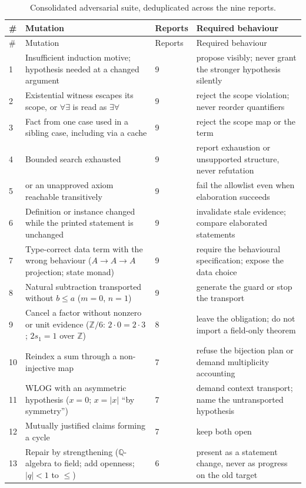 \documentclass[11pt,a4paper]{article}
\newcommand{\code}[1]{\texttt{\detokenize{#1}}}
\theoremstyle{definition}
\begin{document}
\begingroup\small
\begin{longtable}{@{}L{.04\textwidth}L{.45\textwidth}L{.08\textwidth}L{.37\textwidth}@{}}
\caption{Consolidated adversarial suite, deduplicated across the nine reports.}\label{tab:suite}\\
\toprule
\# & Mutation & Reports & Required behaviour\\
\midrule
\endfirsthead
\toprule
\# & Mutation & Reports & Required behaviour\\
\midrule
{} & Insufficient induction motive; hypothesis needed at a changed argument & 9 & propose \code{generalizing} visibly; never grant the stronger hypothesis silently\\
2 & Existential witness escapes its scope, or $\forall\exists$ is read as $\exists\forall$ & 9 & reject the scope violation; never reorder quantifiers\\
3 & Fact from one case used in a sibling case, including via a cache & 9 & reject the scope map or the term\\
4 & Bounded search exhausted & 9 & report exhaustion or unsupported structure, never refutation\\
5 & \code{sorryAx} or an unapproved axiom reachable transitively & 9 & fail the allowlist even when elaboration succeeds\\
6 & Definition or instance changed while the printed statement is unchanged & 9 & invalidate stale evidence; compare elaborated statements\\
7 & Type-correct data term with the wrong behaviour ($A\to A\to A$ projection; state monad) & 9 & require the behavioural specification; expose the data choice\\
8 & Natural subtraction transported without $b\le a$ ($m=0$, $n=1$) & 9 & generate the guard or stop the transport\\
9 & Cancel a factor without nonzero or unit evidence ($\mathbb{Z}/6$: $2\cdot 0=2\cdot 3$; $2s_1=1$ over $\mathbb{Z}$) & 8 & leave the obligation; do not import a field-only theorem\\
10 & Reindex a sum through a non-injective map & 7 & refuse the bijection plan or demand multiplicity accounting\\
11 & WLOG with an asymmetric hypothesis ($x=0$; $x=|x|$ ``by symmetry'') & 7 & demand context transport; name the untransported hypothesis\\
12 & Mutually justified claims forming a cycle & 7 & keep both open\\
13 & Repair by strengthening ($\mathbb{Q}$-algebra to field; add openness; $\vert q\vert<1$ to $\le$) & 6 & present as a statement change, never as progress on the old target\\

\end{longtable}
\end{document}
